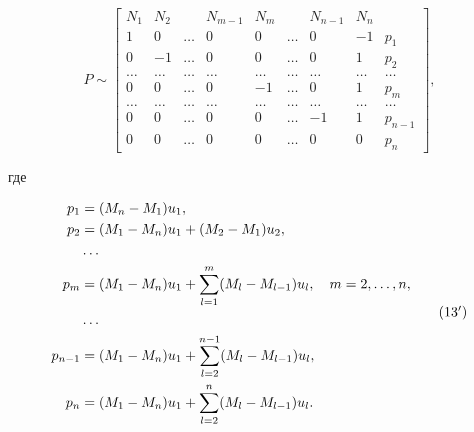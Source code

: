 \begin{equation}


P\sim


\begin{bmatrix}


N_1 & N_2 & & N_{m-1} & N_m & & N_{n-1} & N_n\\


1& 0 & \dots & 0 & 0 & \dots & 0 & -1 & p_1\\


0 & -1 & \dots & 0 & 0 & \dots & 0 & 1 & p_2\\


\dots & \dots & \dots & \dots & \dots & \dots & \dots & \dots & \dots \\


0 & 0 & \dots & 0 & -1 & \dots & 0 & 1 & p_m\\


\dots & \dots & \dots & \dots & \dots & \dots & \dots & \dots & \dots \\


0 & 0 & \dots & 0 & 0 & \dots & -1 & 1 & p_{n-1}\\


0 & 0 & \dots & 0 & 0 & \dots & 0 & 0 & p_n


\end{bmatrix}


,


\end{equation}


где


\begin{equation}


\begin{split}


p_1&=(M_n-M_1)u_1,\\


p_2&=(M_1-M_n)u_1+(M_2-M_1)u_2,\\


&\dots\\


p_m&=(M_1-M_n)u_1+\sum^m_{l=1}(M_l-M_{l-1})u_l,\quad


m=2,\dotsc,n,\\


&\dots\\


p_{n-1}&=(M_1-M_n)u_1+\sum^{n-1}_{l=2}(M_l-M_{l-1})u_l,\\


p_n&=(M_1-M_n)u_1+\sum^n_{l=2}(M_l-M_{l-1})u_l.


\end{split}


\tag{$13{}'$}


\end{equation}





